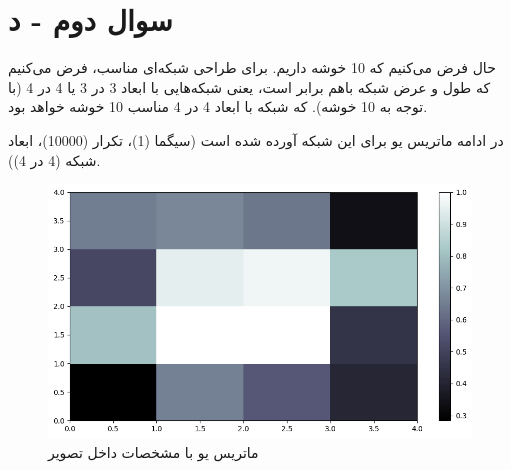 \documentclass{article}
\begin{document}
\section{سوال دوم - د}

حال فرض می‌کنیم که 10 خوشه داریم. برای طراحی شبکه‌ای مناسب، فرض می‌کنیم که طول و عرض شبکه باهم برابر است، یعنی شبکه‌هایی با ابعاد 3 در 3 یا 4 در 4 (با توجه به 10 خوشه). که شبکه با ابعاد 4 در 4 مناسب 10 خوشه خواهد بود.


در ادامه ماتریس یو برای این شبکه آورده شده است (سیگما (1)، تکرار (10000)، ابعاد شبکه (4 در 4)).

\begin{figure}[!h]
    \centering\includegraphics[scale=.65]{./p6-1}
    \caption{ماتریس یو با مشخصات داخل تصویر}\label{fig.61}
\end{figure}
\cleardoublepage
\end{document}
